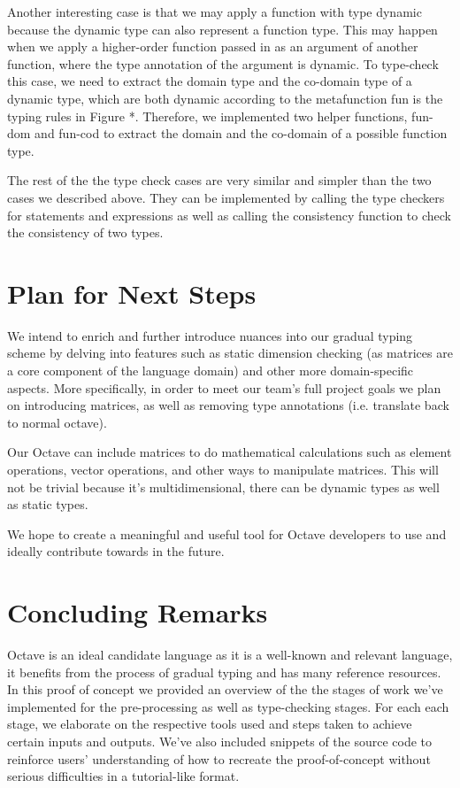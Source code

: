 Another interesting case is that we may apply a function with type dynamic because the dynamic type can also represent a function type. This may happen when we apply a higher-order function passed in as an argument of another function, where the type annotation of the argument is dynamic. To type-check this case, we need to extract the domain type and the co-domain type of a dynamic type, which are both dynamic according to the metafunction fun is the typing rules in Figure *. Therefore, we implemented two helper functions, fun-dom and fun-cod to extract the domain and the co-domain of a possible function type.

The rest of the the type check cases are very similar and simpler than the two cases we described above. They can be implemented by calling the type checkers for statements and expressions as well as calling the consistency function to check the consistency of two types. 


\section{Plan for Next Steps}
We intend to enrich and further introduce nuances into our gradual typing scheme by delving into features such as static dimension checking (as matrices are a core component of the language domain) and other more domain-specific aspects. More specifically, in order to meet our team's full project goals we plan on introducing matrices, as well as removing type annotations (i.e. translate back to normal octave).

Our Octave can include matrices to do mathematical calculations such as element operations, vector operations, and other ways to manipulate matrices. This will not be trivial because it's multidimensional, there can be dynamic types as well as static types.

We hope to create a meaningful and useful tool for Octave developers to use and ideally contribute towards in the future.

\section{Concluding Remarks}
Octave is an ideal candidate language as it is a well-known and relevant language, it benefits from the process of gradual typing and has many reference resources. In this proof of concept we provided an overview of the the stages of work we've implemented for the pre-processing as well as type-checking stages. For each each stage, we elaborate on the respective tools used and steps taken to achieve certain inputs and outputs. We've also included snippets of the source code to reinforce users' understanding of how to recreate the proof-of-concept without serious difficulties in a tutorial-like format.

